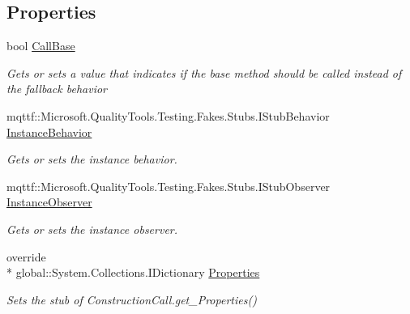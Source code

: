 \subsection*{Properties}
\begin{DoxyCompactItemize}
\item 
bool \hyperlink{class_system_1_1_runtime_1_1_remoting_1_1_messaging_1_1_fakes_1_1_stub_construction_call_acc826667ba7223726b92a5963067cbe3}{Call\-Base}
\begin{DoxyCompactList}\small\item\em Gets or sets a value that indicates if the base method should be called instead of the fallback behavior\end{DoxyCompactList}\item 
mqttf\-::\-Microsoft.\-Quality\-Tools.\-Testing.\-Fakes.\-Stubs.\-I\-Stub\-Behavior \hyperlink{class_system_1_1_runtime_1_1_remoting_1_1_messaging_1_1_fakes_1_1_stub_construction_call_a3d7828a4dcce3a77932effbbd1f982cf}{Instance\-Behavior}
\begin{DoxyCompactList}\small\item\em Gets or sets the instance behavior.\end{DoxyCompactList}\item 
mqttf\-::\-Microsoft.\-Quality\-Tools.\-Testing.\-Fakes.\-Stubs.\-I\-Stub\-Observer \hyperlink{class_system_1_1_runtime_1_1_remoting_1_1_messaging_1_1_fakes_1_1_stub_construction_call_ae891eb3a30b914c33e8d2abc0ea06213}{Instance\-Observer}
\begin{DoxyCompactList}\small\item\em Gets or sets the instance observer.\end{DoxyCompactList}\item 
override \\*
global\-::\-System.\-Collections.\-I\-Dictionary \hyperlink{class_system_1_1_runtime_1_1_remoting_1_1_messaging_1_1_fakes_1_1_stub_construction_call_aeedd344569190b87e2cfa1f30e338d5d}{Properties}
\begin{DoxyCompactList}\small\item\em Sets the stub of Construction\-Call.\-get\-\_\-\-Properties()\end{DoxyCompactList}\end{DoxyCompactItemize}


